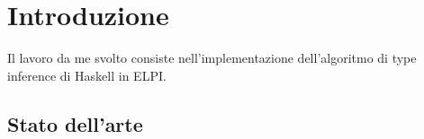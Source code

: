 \documentclass[12pt,a4paper,openright,twoside]{report}
\begin{document}


\tableofcontents	%

\rhead[\fancyplain{}{\bfseries\leftmark}]{\fancyplain{}{\bfseries\thepage}}

\clearpage{\pagestyle{empty}\cleardoublepage}	%








\chapter{Introduzione}		%


Il lavoro da me svolto consiste nell'implementazione dell'algoritmo di type inference di Haskell in ELPI.\\

\section{Stato dell'arte}
\end{document}
